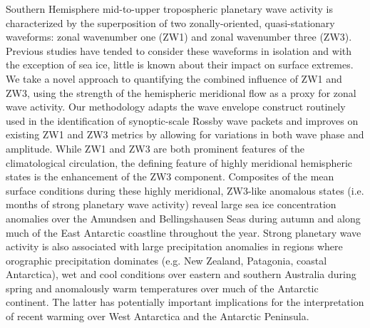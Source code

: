 Southern Hemisphere mid-to-upper tropospheric planetary wave activity is characterized by the superposition of two zonally-oriented, quasi-stationary waveforms: zonal wavenumber one (ZW1) and zonal wavenumber three (ZW3). Previous studies have tended to consider these waveforms in isolation and with the exception of sea ice, little is known about their impact on surface extremes. We take a novel approach to quantifying the combined influence of ZW1 and ZW3, using the strength of the hemispheric meridional flow as a proxy for zonal wave activity. Our methodology adapts the wave envelope construct routinely used in the identification of synoptic-scale Rossby wave packets and improves on existing ZW1 and ZW3 metrics by allowing for variations in both wave phase and amplitude. While ZW1 and ZW3 are both prominent features of the climatological circulation, the defining feature of highly meridional hemispheric states is the enhancement of the ZW3 component. Composites of the mean surface conditions during these highly meridional, ZW3-like anomalous states (i.e. months of strong planetary wave activity) reveal large sea ice concentration anomalies over the Amundsen and Bellingshausen Seas during autumn and along much of the East Antarctic coastline throughout the year. Strong planetary wave activity is also associated with large precipitation anomalies in regions where orographic precipitation dominates (e.g. New Zealand, Patagonia, coastal Antarctica), wet and cool conditions over eastern and southern Australia during spring and anomalously warm temperatures over much of the Antarctic continent. The latter has potentially important implications for the interpretation of recent warming over West Antarctica and the Antarctic Peninsula.
